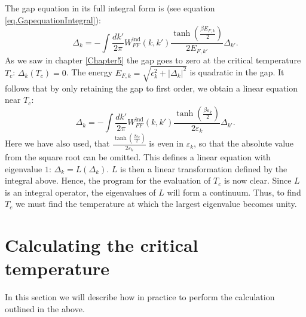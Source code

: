 The gap equation in its full integral form is (see equation \eqref{eq.GapequationIntegral}):
\begin{equation}
\Delta_k = - \int \frac{dk'}{2\pi} W^\text{ind}_{FF}(k,k')\frac{\tanh\left(\frac{\beta E_{F,k}}{2}\right)}{2E_{F,k'}}\Delta_{k'}. \nonumber
\end{equation} 
As we saw in chapter \ref{Chapter5} the gap goes to zero at the critical temperature $T_c$: $\Delta_k(T_c) = 0$. The energy $E_{F,k} = \sqrt{\epsilon_k^2 + |\Delta_k|^2}$ is quadratic in the gap. It follows that by only retaining the gap to first order, we obtain a linear equation near $T_c$:
\begin{equation}
\Delta_k = - \int \frac{dk'}{2\pi} W^\text{ind}_{FF}(k,k')\frac{\tanh\left(\frac{\beta \varepsilon_k}{2}\right)}{2\varepsilon_k} \Delta_{k'}.
\label{eq.GapequationIntegralLinear}
\end{equation} 
Here we have also used, that $\frac{\tanh\left(\frac{\beta \varepsilon_k}{2}\right)}{2\varepsilon_k}$ is even in $\varepsilon_k$, so that the absolute value from the square root can be omitted. This defines a linear equation with eigenvalue $1$: $\Delta_k = L(\Delta_k)$. $L$ is then a linear transformation defined by the integral above. Hence, the program for the evaluation of $T_c$ is now clear. Since $L$ is an integral operator, the eigenvalues of $L$ will form a continuum. Thus, to find $T_c$ we must find the temperature at which the largest eigenvalue becomes unity. 


\section{Calculating the critical temperature} \label{sec.criticaltemperature.numerical}
In this section we will describe how in practice to perform the calculation outlined in the above. 


